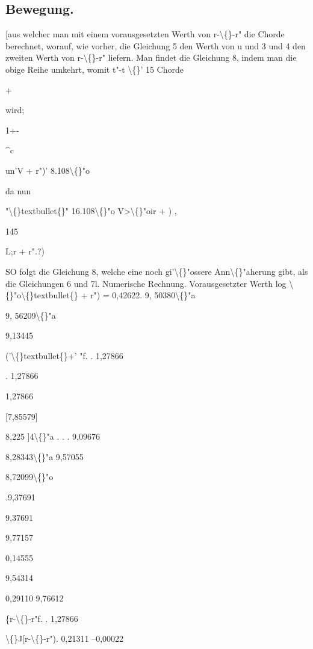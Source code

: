 \documentclass[10pt,a4paper]{article}
\begin{document}

\subsection*{Bewegung.}

[aus welcher man mit einem vorausgesetzten Werth von r-\textbackslash\{\}-r" die Chorde
berechnet, worauf, wie vorher, die Gleichung 5 den Werth von u und 3 und
4 den zweiten Werth von r-\textbackslash\{\}-r" liefern.
Man findet die Gleichung 8, indem man die obige Reihe umkehrt, womit
t"-t \textbackslash\{\}'
15
Chorde

+

wird;

1+-

\textasciicircum{}c

un'V + r")'
8.108\textbackslash\{\}"o

da nun

"\textbackslash\{\}textbullet\{\}" 16.108\textbackslash\{\}"o V>\textbackslash\{\}"oir + )
,

145

L;r + r".?)

SO folgt die Gleichung 8, welche eine noch gi'\textbackslash\{\}"ossere Ann\textbackslash\{\}"aherung gibt, als die
Gleichungen 6 und 7l.
Numerische Rechnung.
Vorausgesetzter Werth log \textbackslash\{\}"o\textbackslash\{\}textbullet\{\} + r") = 0,42622.
9, 50380\textbackslash\{\}"a

9, 56209\textbackslash\{\}"a

9,13445

('\textbackslash\{\}textbullet\{\}+' "f. . 1,27866

. 1,27866

1,27866

[7,85579]

8,225 ]4\textbackslash\{\}"a
. . . 9,09676

8,28343\textbackslash\{\}"a
9,57055

8,72099\textbackslash\{\}"o

.9,37691

9,37691

9,77157

0,14555

9,54314

0,29110
9,76612

\{r-\textbackslash\{\}-r"f. . 1,27866

\textbackslash\{\}J[r-\textbackslash\{\}-r"). 0,21311
--0,00022
\end{document}
